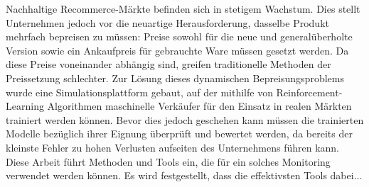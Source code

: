 Nachhaltige Recommerce-Märkte befinden sich in stetigem Wachstum. Dies stellt Unternehmen jedoch vor die neuartige Herausforderung, dasselbe Produkt mehrfach bepreisen zu müssen: Preise sowohl für die neue und generalüberholte Version sowie ein Ankaufpreis für gebrauchte Ware müssen gesetzt werden. Da diese Preise voneinander abhängig sind, greifen traditionelle Methoden der Preissetzung schlechter. Zur Lösung dieses dynamischen Bepreisungsproblems wurde eine Simulationsplattform gebaut, auf der mithilfe von Reinforcement-Learning Algorithmen maschinelle Verkäufer für den Einsatz in realen Märkten trainiert werden können. Bevor dies jedoch geschehen kann müssen die trainierten Modelle bezüglich ihrer Eignung überprüft und bewertet werden, da bereits der kleinste Fehler zu hohen Verlusten aufseiten des Unternehmens führen kann. Diese Arbeit führt Methoden und Tools ein, die für ein solches Monitoring verwendet werden können. Es wird festgestellt, dass die effektivsten Tools dabei... 